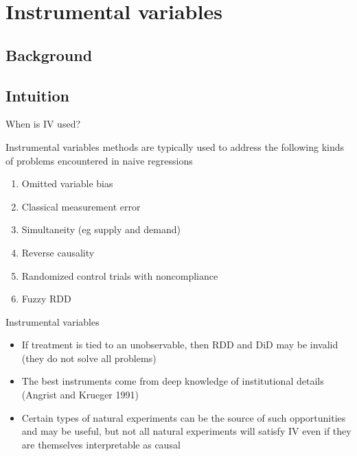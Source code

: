 \documentclass{beamer}
\begin{document}



\section{Instrumental variables}

\subsection{Background}
\subsection{Intuition}


\begin{frame}{When is IV used?}
	
Instrumental variables methods are typically used to address the following kinds of problems encountered in naive regressions
		\begin{enumerate}
		\item Omitted variable bias
		\item Classical measurement error
		\item Simultaneity (eg supply and demand)
		\item Reverse causality
		\item Randomized control trials with noncompliance
		\item Fuzzy RDD
		\end{enumerate}
		

\end{frame}
\begin{frame}{Instrumental variables}

\begin{itemize}
\item If treatment is tied to an unobservable, then RDD and DiD may be invalid (they do not solve all problems)
\item The best instruments come from deep knowledge of institutional details (Angrist and Krueger 1991)
\item Certain types of natural experiments can be the source of such opportunities and may be useful, but not all natural experiments will satisfy IV even if they are themselves interpretable as causal
\end{itemize}

\end{frame}
\end{document}
